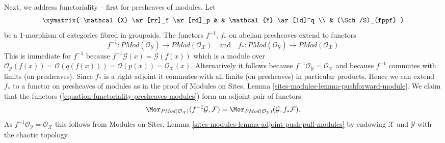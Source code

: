 \medskip\noindent
Next, we address functoriality -- first for presheaves of modules. Let
$$
\xymatrix{
\mathcal{X} \ar[rr]_f \ar[rd]_p & &  \mathcal{Y} \ar[ld]^q \\
& (\Sch/S)_{fppf}
}
$$
be a $1$-morphism of categories fibred in groupoids.
The functors $f^{-1}$, $f_*$ on abelian presheaves extend to functors
\begin{equation}
\label{equation-functoriality-presheaves-modules}
f^{-1} :
\textit{PMod}(\mathcal{O}_\mathcal{Y})
\longrightarrow
\textit{PMod}(\mathcal{O}_\mathcal{X})
\quad\text{and}\quad
f_* :
\textit{PMod}(\mathcal{O}_\mathcal{Y})
\longrightarrow
\textit{PMod}(\mathcal{O}_\mathcal{X})
\end{equation}
This is immediate for $f^{-1}$ because
$f^{-1}\mathcal{G}(x) = \mathcal{G}(f(x))$ which is a module over
$\mathcal{O}_\mathcal{Y}(f(x)) = \mathcal{O}(q(f(x))) = \mathcal{O}(p(x)) =
\mathcal{O}_\mathcal{X}(x)$. Alternatively it follows because
$f^{-1}\mathcal{O}_\mathcal{Y} = \mathcal{O}_\mathcal{X}$
and because $f^{-1}$ commutes with limits (on presheaves).
Since $f_*$ is a right adjoint it commutes with all limits
(on presheaves) in particular products. Hence we can extend
$f_*$ to a functor on presheaves of modules as in the proof of
Modules on Sites, Lemma \ref{sites-modules-lemma-pushforward-module}.
We claim that the functors (\ref{equation-functoriality-presheaves-modules})
form an adjoint pair of functors:
$$
\Mor_{\textit{PMod}(\mathcal{O}_\mathcal{X})}(
f^{-1}\mathcal{G}, \mathcal{F})
=
\Mor_{\textit{PMod}(\mathcal{O}_\mathcal{Y})}(
\mathcal{G}, f_*\mathcal{F}).
$$
As $f^{-1}\mathcal{O}_\mathcal{Y} = \mathcal{O}_\mathcal{X}$
this follows from
Modules on Sites, Lemma \ref{sites-modules-lemma-adjoint-push-pull-modules}
by endowing $\mathcal{X}$ and $\mathcal{Y}$ with the chaotic
topology.

